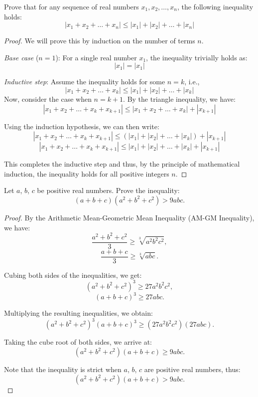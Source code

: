 \documentclass[
	12pt, %
	fleqn, %
	a4paper, %
]{LegrandOrangeBook}
\begin{document}
\begin{exercise}
    Prove that for any sequence of real numbers \( x_1, x_2, \ldots, x_n \), the following inequality holds:
\[ \left|x_1 + x_2 + \ldots + x_n\right| \leq \left|x_1\right| + \left|x_2\right| + \ldots + \left|x_n\right| \]
\end{exercise}
\begin{proof}
    We will prove this by induction on the number of terms \( n \).

\textit{Base case} (\( n = 1 \)):
For a single real number \( x_1 \), the inequality trivially holds as:
\[ \left|x_1\right| = \left|x_1\right| \]

\textit{Inductive step}:
Assume the inequality holds for some \( n = k \), i.e.,
\[ \left|x_1 + x_2 + \ldots + x_k\right| \leq \left|x_1\right| + \left|x_2\right| + \ldots + \left|x_k\right| \]
Now, consider the case when \( n = k + 1 \). By the triangle inequality, we have:
\[ \left|x_1 + x_2 + \ldots + x_k + x_{k+1}\right| \leq \left|x_1 + x_2 + \ldots + x_k\right| + \left|x_{k+1}\right| \]

Using the induction hypothesis, we can then write:
\[ \left|x_1 + x_2 + \ldots + x_k + x_{k+1}\right| \leq \left(\left|x_1\right| + \left|x_2\right| + \ldots + \left|x_k\right|\right) + \left|x_{k+1}\right| \]
\[ \left|x_1 + x_2 + \ldots + x_k + x_{k+1}\right| \leq \left|x_1\right| + \left|x_2\right| + \ldots + \left|x_k\right| + \left|x_{k+1}\right| \]

This completes the inductive step and thus, by the principle of mathematical induction, the inequality holds for all positive integers \( n \).
\end{proof}

\begin{exercise}
    Let \(a\), \(b\), \(c\) be positive real numbers. Prove the inequality:
\[ (a+b+c)(a^2+b^2+c^2) > 9abc. \]
\end{exercise}
\begin{proof}
    By the Arithmetic Mean-Geometric Mean Inequality (AM-GM Inequality), we have:
\[ \frac{a^2+b^2+c^2}{3} \geq \sqrt[3]{a^2b^2c^2}, \]
\[ \frac{a+b+c}{3} \geq \sqrt[3]{abc}. \]

Cubing both sides of the inequalities, we get:
\[ (a^2+b^2+c^2)^3 \geq 27a^2b^2c^2, \]
\[ (a+b+c)^3 \geq 27abc. \]

Multiplying the resulting inequalities, we obtain:
\[ (a^2+b^2+c^2)^3(a+b+c)^3 \geq (27a^2b^2c^2)(27abc). \]

Taking the cube root of both sides, we arrive at:
\[ (a^2+b^2+c^2)(a+b+c) \geq 9abc. \]

Note that the inequality is strict when \(a\), \(b\), \(c\) are positive real numbers, thus:
\[ (a^2+b^2+c^2)(a+b+c) > 9abc. \]
\end{proof}
\end{document}
